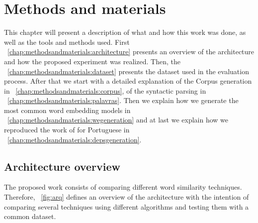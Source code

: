 \section{Methods and materials}\label{chap:methodsandmaterials}

This chapter will present a description of what and how this work was done, as well as the tools and methods used. First ~\autoref{chap:methodsandmaterials:architecture} presents an overview of the architecture and how the proposed experiment was realized. Then, the ~\autoref{chap:methodsandmaterials:dataset} presents the dataset used in the evaluation process. After that we start with a detailed explanation of the Corpus generation in ~\autoref{chap:methodsandmaterials:corpus}, of the syntactic parsing in ~\autoref{chap:methodsandmaterials:palavras}. Then we explain how we generate the most common word embedding models in ~\autoref{chap:methodsandmaterials:wegeneration} and at last we explain how we reproduced the work of  for Portuguese in ~\autoref{chap:methodsandmaterials:depsgeneration}.

\subsection{Architecture overview}\label{chap:methodsandmaterials:architecture}

The proposed work consists of comparing different word similarity techniques. Therefore, ~\autoref{fig:arq} defines an overview of the architecture with the intention of comparing several techniques using different algorithms and testing them with a common dataset.

